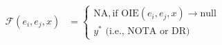\begin{align}
    \mathcal{F}(e_i, e_j, x) &= 
    \begin{cases} 
        \text{NA}, \text{if } \text{OIE}(e_i, e_j, x) \rightarrow \text{null} \\
        y^* \text{ (i.e., NOTA or DR)}
    \end{cases}
\end{align}







